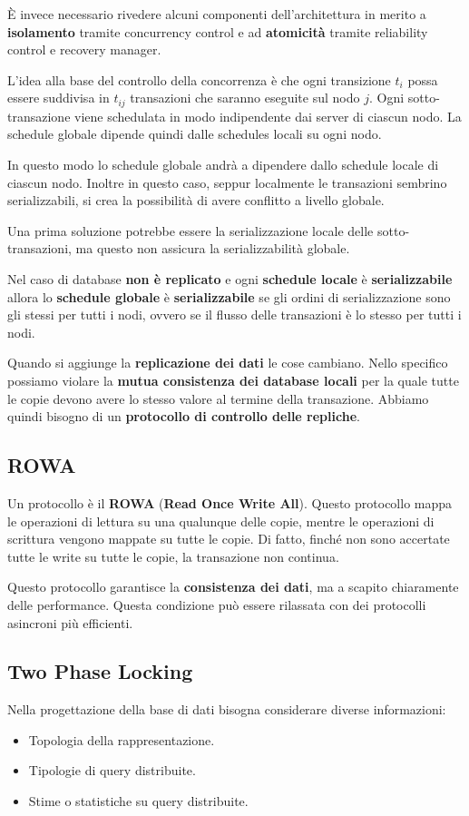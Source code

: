 È invece necessario rivedere alcuni componenti dell'architettura in merito a
\textbf{isolamento} tramite concurrency control e ad \textbf{atomicità} tramite
reliability control e recovery manager.

L'idea alla base del controllo della concorrenza è che ogni transizione $t_i$
possa essere suddivisa in $t_{ij}$ transazioni che saranno eseguite sul nodo $j$.
Ogni sotto-transazione viene schedulata in modo indipendente dai server di
ciascun nodo. La schedule globale dipende quindi dalle schedules locali su ogni nodo.

In questo modo lo schedule globale andrà a dipendere dallo schedule locale di
ciascun nodo. Inoltre in questo caso, seppur localmente le transazioni sembrino
serializzabili, si crea la possibilità di avere conflitto a livello globale.

Una prima soluzione potrebbe essere la serializzazione locale delle sotto-transazioni,
ma questo non assicura la serializzabilità globale.

Nel caso di database \textbf{non è replicato} e ogni \textbf{schedule locale} è
\textbf{serializzabile} allora lo  \textbf{schedule globale} è \textbf{serializzabile}
se gli ordini di serializzazione sono gli stessi per tutti i nodi, ovvero se il
flusso delle transazioni è lo stesso per tutti i nodi.

Quando si aggiunge la  \textbf{replicazione dei dati} le cose cambiano. Nello
specifico possiamo violare la \textbf{mutua consistenza dei database locali} per
la quale tutte le copie devono avere lo stesso valore al termine della transazione.
Abbiamo quindi bisogno di un \textbf{protocollo di controllo delle repliche}.
\subsection{ROWA}
Un protocollo è il \textbf{ROWA} (\textbf{Read Once Write All}). Questo
protocollo mappa le operazioni di lettura su una qualunque delle copie, mentre
le operazioni di scrittura vengono mappate su tutte le copie. Di fatto, finché
non sono accertate tutte le write su tutte le copie, la transazione non continua.

Questo protocollo garantisce la \textbf{consistenza dei dati}, ma a scapito
chiaramente delle performance. Questa condizione può essere rilassata con dei
protocolli asincroni più efficienti.
\subsection{Two Phase Locking}
Nella progettazione della base di dati bisogna considerare diverse informazioni:
\begin{itemize}
      \item Topologia della rappresentazione.
      \item Tipologie di query distribuite.
      \item Stime o statistiche su query distribuite.
\end{itemize}

